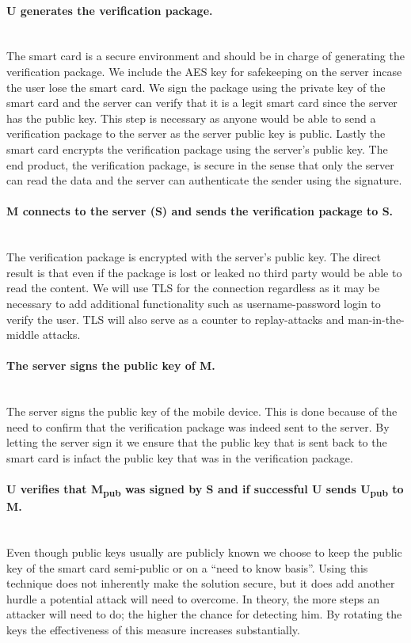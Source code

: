 \paragraph{U generates the verification package.}\mbox{}\\
The smart card is a secure environment and should be in charge of generating the verification package. We include the AES key for safekeeping on the server incase the user lose the smart card. We sign the package using the private key of the smart card and the server can verify that it is a legit smart card since the server has the public key. This step is necessary as anyone would be able to send a verification package to the server as the server public key is public. Lastly the smart card encrypts the verification package using the server's public key. The end product, the verification package, is secure in the sense that only the server can read the data and the server can authenticate the sender using the signature.

\paragraph{M connects to the server (S) and sends the verification package to S.}\mbox{}\\
The verification package is encrypted with the server's public key. The direct result is that even if the package is lost or leaked no third party would be able to read the content. We will use TLS for the connection regardless as it may be necessary to add additional functionality such as username-password login to verify the user. TLS will also serve as a counter to replay-attacks and man-in-the-middle attacks.

\paragraph{The server signs the public key of M.}\mbox{}\\
The server signs the public key of the mobile device. This is done because of the need to confirm that the verification package was indeed sent to the server. By letting the server sign it we ensure that the public key that is sent back to the smart card is infact the public key that was in the verification package.

\paragraph{U verifies that M\textsubscript{pub} was signed by S and if successful U sends U\textsubscript{pub} to M.}\mbox{}\\
Even though public keys usually are publicly known we choose to keep the public key of the smart card semi-public or on a ``need to know basis''. Using this technique does not inherently make the solution secure, but it does add another hurdle a potential attack will need to overcome. In theory, the more steps an attacker will need to do; the higher the chance for detecting him. By rotating the keys the effectiveness of this measure increases substantially.


